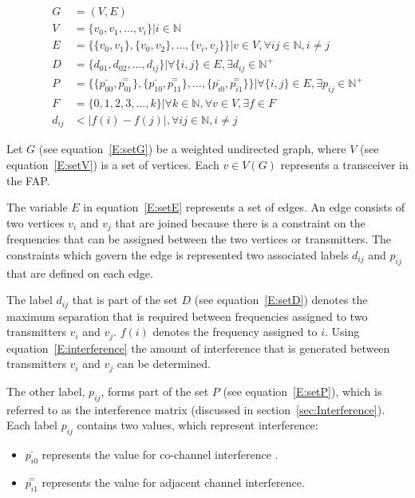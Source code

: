 \begin{align}
	G &= (V,E) \label{E:setG}\\
	V &= \{v_0,v_1,\ldots,v_i\} | i \in \mathbb{N} \label{E:setV}\\
	E &= \{\{v_0,v_1\},\{v_0,v_2\},\ldots,\{v_i,v_j\}\}|v \in V,\forall ij \in \mathbb{N},i \neq j \label{E:setE}\\
	D &= \{d_{01},d_{02},\ldots,d_{ij}\}| \forall\{i,j\} \in E, \exists d_{ij} \in \mathbb{N}^+ \label{E:setD}\\
P &= \{\{\bar{p_{00}},\overset{=}{p_{01}}\},\{\bar{p_{10}},\overset{=}{p_{11}}\},\ldots,\{\bar{p_{i0}},\overset{=}{p_{i1}}\}\}| \forall \{i,j\} \in E,\exists p_{ij} \in \mathbb{N}^+ \label{E:setP}\\
	F &= \{0,1,2,3,\ldots,k\}| \forall k \in \mathbb{N},\forall v \in V ,\exists f \in F\label{E:setF}\\
	d_{ij} &< |f(i) - f(j)|, \forall ij \in \mathbb{N},i \neq j \label{E:interference}
\end{align}

Let $G$ (see equation~\ref{E:setG}) be a weighted undirected graph, where $V$ (see equation~\ref{E:setV}) is a set of vertices\cite{MontemanniThesis}. Each $v \in V(G)$ represents a transceiver in the \gls{FAP}\cite{MontemanniThesis}. 

The variable $E$ in equation~\ref{E:setE} represents a set of edges\cite{MontemanniThesis}. An edge consists of two vertices $v_i$ and $v_j$ that are joined because there is a constraint on the frequencies that can be assigned between the two vertices or transmitters\cite{MontemanniThesis}. The constraints which govern the edge is represented two associated labels $d_{ij}$ and $p_{ij}$ that are defined on each edge\cite{FAPOrientationModel,TabuMontemanniSmith}. 

The label $d_{ij}$ that is part of the set $D$ (see equation~\ref{E:setD}) denotes the maximum separation that is required between frequencies assigned to two transmitters $v_i$ and $v_j$. $f(i)$ denotes the frequency assigned to $i$. Using equation~\ref{E:interference} the amount of interference that is generated between transmitters $v_i$ and $v_j$ can be determined\cite{FAPOrientationModel,TabuMontemanniSmith}.

The other label, $p_{ij}$, forms part of the set $P$ (see equation~\ref{E:setP}), which is referred to as the interference matrix (discussed in section~\ref{sec:Interference})\cite{Eisenblatter}. Each label $p_{ij}$ contains two values, which represent interference:
\begin{itemize}
\item $\bar{p_{i0}}$ represents the value for co-channel interference \cite{FAPOrientationModel,TabuMontemanniSmith}. 
\item $\overset{=}{p_{i1}}$ represents the value for adjacent channel interference\cite{FAPOrientationModel,TabuMontemanniSmith}.
\end{itemize}

